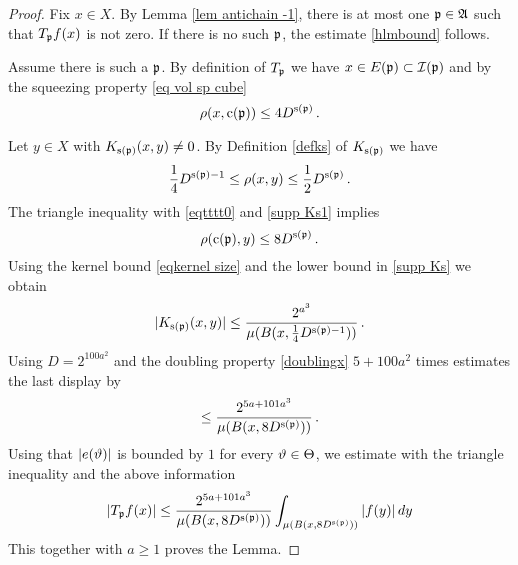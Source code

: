 {\begin{proof}
Fix $x\in X$.  By Lemma \ref{lem antichain -1}, there is at most one $\mathfrak p \in \mathfrak{A}$
such that
 $T_{\mathfrak p} f(x)$ is not zero.
 If there is no such $\mathfrak p$, the estimate \eqref{hlmbound} follows.

 Assume there is such a $\mathfrak p$.
 By definition of $T_{\mathfrak p}$ we have $x\in E(\mathfrak p)\subset \mathcal{I}(\mathfrak p)$ and  by the squeezing property \eqref{eq vol sp cube}
\begin{equation}\label{eqtttt0}
    \rho(x, \mathrm{c}(\mathfrak p))\le 4D^{\mathrm{s}(\mathfrak p)}\, .
\end{equation}

Let $y\in X$ with  $K_{\mathrm{s}(\mathfrak p)}(x,y)\neq 0$. By Definition \eqref{defks} of $K_{\mathrm{s}(\mathfrak p)}$
we have
\begin{equation}\label{supp Ks1}
   \frac{1}{4} D^{\mathrm{s}(\mathfrak p)-1}
   \leq \rho(x,y) \leq \frac{1}{2} D^{\mathrm{s}(\mathfrak p)}\, .
\end{equation}
The triangle inequality with \eqref{eqtttt0} and \eqref{supp Ks1} implies
\begin{equation}
    \rho(\mathrm{c}(\mathfrak p),y)\le 8D^{\mathrm{s}(\mathfrak p)}\, .
\end{equation}
Using the kernel bound \eqref{eqkernel size} and the lower bound in \eqref{supp Ks}
we obtain
\begin{equation}
|K_{\mathrm{s}(\mathfrak p)}(x,y)|\le \frac{2^{a^3}}{\mu(B(x,\frac 14 D^{{\mathrm{s}(\mathfrak p)}-1}))}\, .
\end{equation}
Using $D=2^{100a^2}$
and the doubling property \eqref{doublingx} $5 +100a^2$ times estimates
the last display by
\begin{equation}
\le \frac{2^{5a+101a^3}}{\mu(B(x,  8D^{\mathrm{s}(\mathfrak p)}))}\, .
\end{equation}
 Using that {$|e(\vartheta)|$} is bounded by $1$
for every $\vartheta\in \Theta$, we estimate with the triangle inequality and the above information
 \begin{equation}
  | T_{\mathfrak p} f(x)|
    \le \frac{2^{5a+101 a^3}}{\mu(B(x, 8D^{\mathrm{s}(\mathfrak p)}))} \int _{\mu(B(x, 8D^{\mathrm{s}(\mathfrak p)}))} |f(y)|\, dy   \end{equation}
This together with $a\ge 1$ proves the Lemma.
\end{proof}

}
